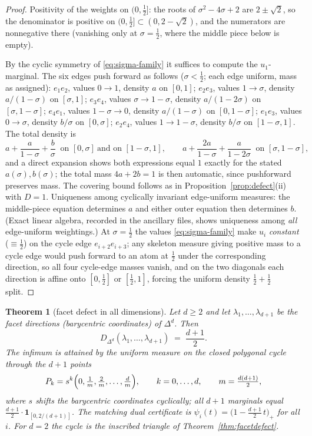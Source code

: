 \documentclass[11pt,reqno]{amsart}
\theoremstyle{plain}
\newtheorem{theorem}{Theorem}[section]
\theoremstyle{definition}
\theoremstyle{remark}
\begin{document}
\begin{proof}
Positivity of the weights on $(0,\tfrac12]$: the roots of $\sigma^2-4\sigma+2$
are $2\pm\sqrt2$, so the denominator is positive on
$(0,\tfrac12]\subset(0,2-\sqrt2)$, and the numerators are nonnegative there
(vanishing only at $\sigma=\tfrac12$, where the middle piece below is empty).

By the cyclic symmetry of \eqref{eq:sigma-family} it suffices to compute the
$u_1$-marginal. The six edges push forward as follows ($\sigma<\tfrac12$; each
edge uniform, mass as assigned): $e_1e_2$, values $0\to1$, density $a$ on
$[0,1]$; $e_2e_3$, values $1\to\sigma$, density $a/(1-\sigma)$ on $[\sigma,1]$;
$e_3e_4$, values $\sigma\to1-\sigma$, density $a/(1-2\sigma)$ on
$[\sigma,1-\sigma]$; $e_4e_1$, values $1-\sigma\to0$, density $a/(1-\sigma)$ on
$[0,1-\sigma]$; $e_1e_3$, values $0\to\sigma$, density $b/\sigma$ on
$[0,\sigma]$; $e_2e_4$, values $1\to1-\sigma$, density $b/\sigma$ on
$[1-\sigma,1]$. The total density is
\[
a+\frac{a}{1-\sigma}+\frac b\sigma\ \text{ on }[0,\sigma]\ \text{and on }
[1-\sigma,1],\qquad
a+\frac{2a}{1-\sigma}+\frac{a}{1-2\sigma}\ \text{ on }[\sigma,1-\sigma],
\]
and a direct expansion shows both expressions equal $1$ exactly for the stated
$a(\sigma),b(\sigma)$; the total mass $4a+2b=1$ is then automatic, since
pushforward preserves mass. The covering bound follows as in
Proposition~\ref{prop:defect}(ii) with $D=1$. Uniqueness among cyclically
invariant edge-uniform measures: the middle-piece equation determines $a$ and
either outer equation then determines $b$. (Exact linear algebra, recorded in
the ancillary files, shows uniqueness among \emph{all} edge-uniform weightings.)
At $\sigma=\tfrac12$ the values \eqref{eq:sigma-family}
make $u_i$ \emph{constant} ($\equiv\tfrac12$) on the cycle edge
$e_{i+2}e_{i+3}$; any skeleton measure giving positive mass to a cycle edge
would push forward to an atom at $\tfrac12$ under the corresponding direction,
so all four cycle-edge masses vanish, and on the two diagonals each direction is
affine onto $[0,\tfrac12]$ or $[\tfrac12,1]$, forcing the uniform density
$\tfrac12+\tfrac12$ split.
\end{proof}

\begin{theorem}[facet defect in all dimensions]\label{thm:facetd}
Let $d\ge2$ and let $\lambda_1,\dots,\lambda_{d+1}$ be the facet directions
(barycentric coordinates) of $\Delta^d$. Then
\[
D_{\Delta^d}(\lambda_1,\dots,\lambda_{d+1})\;=\;\frac{d+1}2 .
\]
The infimum is attained by the uniform measure on the closed polygonal cycle
through the $d+1$ points
\[
P_k=s^k\Bigl(0,\tfrac1m,\tfrac2m,\dots,\tfrac dm\Bigr),\qquad k=0,\dots,d,
\qquad m=\tfrac{d(d+1)}2,
\]
where $s$ shifts the barycentric coordinates cyclically; all $d+1$ marginals
equal $\tfrac{d+1}2\cdot\mathbf1_{[0,2/(d+1)]}$. The matching dual certificate
is $\psi_i(t)=\bigl(1-\tfrac{d+1}2\,t\bigr)_+$ for all $i$. For $d=2$ the cycle
is the inscribed triangle of Theorem~\ref{thm:facetdefect}.
\end{theorem}
\end{document}
